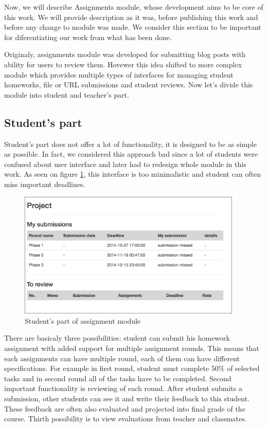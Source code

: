 Now, we will describe Assignments module, whose development aims to be core of this work. We will provide description as it was, before publishing this work and before any change to module was made. We consider this section to be important for diferentiating our work from what has been done.


Originaly, assignments module was developed for submitting blog posts with ability for users to review them. Hovewer this idea shifted to more complex module which provides multiple types of interfaces for managing student homeworks, file or URL submissions and student reviews. Now let's divide this module into student and teacher's part.

\subsection{Student's part}

Student's part does not offer a lot of functionality, it is designed to be as simple as possible. In fact, we considered this approach bad since a lot of students were confused about user interface and later had to redesign whole module in this work. As seen on figure \ref{assstudent}, this interface is too minimalistic and student can often miss important deadlines.

\begin{figure}[h]
    \centering
    \includegraphics[width=0.95\textwidth]{images/assstudent.png}
    \caption{Student's part of assignment module}
    \label{assstudent}
\end{figure}


There are basicaly three possibilities: student can submit his homework assignment with added support for multiple assignment rounds. This means that each assignments can have multiple round, each of them can have different specifications. For example in first round, student must complete 50\% of selected tasks and in second round all of the tasks have to be completed. Second important functionality is reviewing of each round. After student submits a submission, other students can see it and write their feedback to this student. These feedback are often also evaluated and projected into final grade of the course. Thirth possibility is to view evaluations from teacher and classmates.

